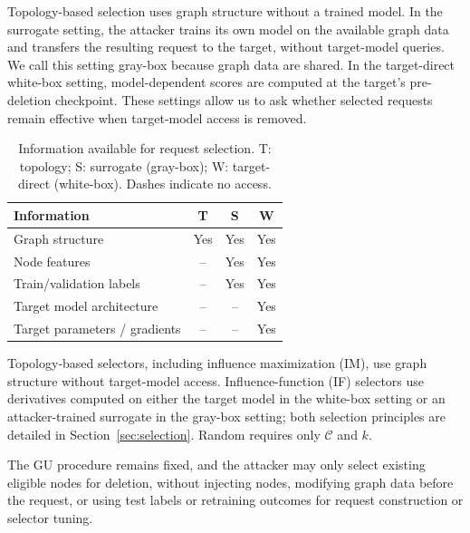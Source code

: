\begin{table}[t]
\begin{minipage}[t]{0.43\linewidth}
\vspace{0pt}
Topology-based selection uses graph structure without a trained model. In the surrogate setting, the attacker trains its own model on the available graph data and transfers the resulting request to the target, without target-model queries. We call this setting gray-box because graph data are shared. In the target-direct white-box setting, model-dependent scores are computed at the target's pre-deletion checkpoint. These settings allow us to ask whether selected requests remain effective when target-model access is removed.
\end{minipage}\hfill
\begin{minipage}[t]{0.54\linewidth}
\vspace{0pt}
\centering
\caption{Information available for request selection. T: topology; S: surrogate (gray-box); W: target-direct (white-box). Dashes indicate no access.}
\label{tab:attacker-access}
\small
\setlength{\tabcolsep}{4pt}
\begin{tabular}{@{}lccc@{}}
\toprule
Information & T & S & W \\
\midrule
Graph structure & Yes & Yes & Yes \\
Node features & -- & Yes & Yes \\
Train/validation labels & -- & Yes & Yes \\
Target model architecture & -- & -- & Yes \\
Target parameters / gradients & -- & -- & Yes \\
\bottomrule
\end{tabular}
\end{minipage}
\end{table}

Topology-based selectors, including influence maximization (IM), use graph structure without target-model access. Influence-function (IF) selectors use derivatives computed on either the target model in the white-box setting or an attacker-trained surrogate in the gray-box setting; both selection principles are detailed in Section~\ref{sec:selection}. Random requires only $\mathcal C$ and $k$.

The GU procedure remains fixed, and the attacker may only select existing eligible nodes for deletion, without injecting nodes, modifying graph data before the request, or using test labels or retraining outcomes for request construction or selector tuning.
